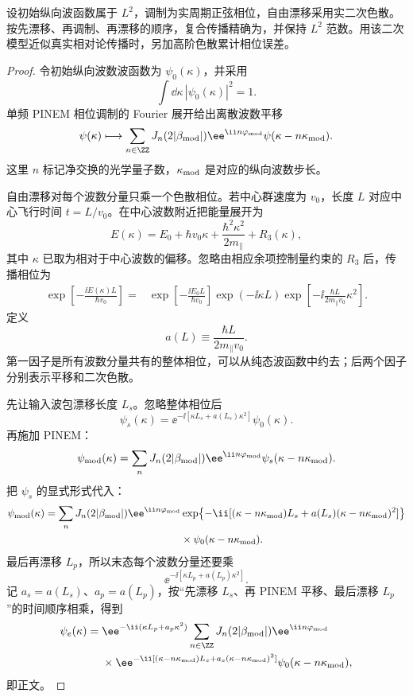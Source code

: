 \begin{proposition}[相位调制与二次漂移的幺正复合]
设初始纵向波函数属于 $L^2$，调制为实周期正弦相位，自由漂移采用实二次色散。按先漂移、再调制、再漂移的顺序，复合传播精确为，并保持 $L^2$ 范数。用该二次模型近似真实相对论传播时，另加高阶色散累计相位误差。
\end{proposition}
\begin{proof}
令初始纵向波数波函数为 $\psi_0(\kappa)$，并采用
\[
\int\dd\kappa\,|\psi_0(\kappa)|^2=1.
\]
单频 PINEM 相位调制的 Fourier 展开给出离散波数平移
\[
\psi(\kappa)
\longmapsto
\sum_{n\in\ZZ}
J_n(2|\beta_{\rm mod}|)
\ee^{\ii n\varphi_{\rm mod}}
\psi(\kappa-n\kappa_{\rm mod}).
\]
这里 $n$ 标记净交换的光学量子数，$\kappa_{\rm mod}$ 是对应的纵向波数步长。

自由漂移对每个波数分量只乘一个色散相位。若中心群速度为 $v_0$，长度 $L$ 对应中心飞行时间
$t=L/v_0$。在中心波数附近把能量展开为
\[
E(\kappa)
=E_0+\hbar v_0\kappa
+\frac{\hbar^2\kappa^2}{2m_\parallel}+R_3(\kappa),
\]
其中 $\kappa$ 已取为相对于中心波数的偏移。忽略由相应余项控制量约束的 $R_3$ 后，传播相位为
\begin{align*}
\exp\!\left[-\frac{\ii E(\kappa)L}{\hbar v_0}\right]
={}&\exp\!\left[-\frac{\ii E_0L}{\hbar v_0}\right]
\exp(-\ii\kappa L)
\exp\!\left[-\ii\frac{\hbar L}{2m_\parallel v_0}\kappa^2\right].
\end{align*}
定义
\[
a(L)\equiv\frac{\hbar L}{2m_\parallel v_0}.
\]
第一因子是所有波数分量共有的整体相位，可以从纯态波函数中约去；后两个因子分别表示平移和二次色散。

先让输入波包漂移长度 $L_s$。忽略整体相位后
\[
\psi_s(\kappa)
=\ee^{-\ii[\kappa L_s+a(L_s)\kappa^2]}\psi_0(\kappa).
\]
再施加 PINEM：
\begin{align*}
\psi_{\rm mod}(\kappa)
=\sum_nJ_n(2|\beta_{\rm mod}|)
\ee^{\ii n\varphi_{\rm mod}}
\psi_s(\kappa-n\kappa_{\rm mod}).
\end{align*}
把 $\psi_s$ 的显式形式代入：
\begin{align*}
\psi_{\rm mod}(\kappa)
=\sum_nJ_n(2|\beta_{\rm mod}|)
\ee^{\ii n\varphi_{\rm mod}}
&\exp\!\left\{-\ii[(\kappa-n\kappa_{\rm mod})L_s
+a(L_s)(\kappa-n\kappa_{\rm mod})^2]\right\}\\
&\times\psi_0(\kappa-n\kappa_{\rm mod}).
\end{align*}
最后再漂移 $L_p$，所以末态每个波数分量还要乘
\[
\ee^{-\ii[\kappa L_p+a(L_p)\kappa^2]}.
\]
记 $a_s=a(L_s)$、$a_p=a(L_p)$，按“先漂移 $L_s$、再 PINEM 平移、最后漂移 $L_p$”的时间顺序相乘，得到
\[
\begin{aligned}
\psi_e(\kappa)={}&
\ee^{-\ii(\kappa L_p+a_p\kappa^2)}
\sum_{n\in\ZZ}
J_n(2|\beta_{\rm mod}|)\ee^{\ii n\varphi_{\rm mod}}\\
&\times
\ee^{-\ii[(\kappa-n\kappa_{\rm mod})L_s
+a_s(\kappa-n\kappa_{\rm mod})^2]}
\psi_0(\kappa-n\kappa_{\rm mod}),
\end{aligned}
\]
即正文。
\end{proof}


